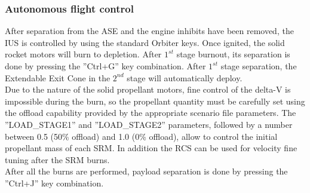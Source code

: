 \documentclass[Space_Shuttle_Ultra_Manual.tex]{subfiles}
\begin{document}
\begin{multicols*}{2}
\subsubsection{Autonomous flight control}
After separation from the ASE and the engine inhibits have been removed, the IUS is controlled by using the standard Orbiter keys. Once ignited, the solid rocket motors will burn to depletion. After $1^{st}$ stage burnout, its separation is done by pressing the ''Ctrl+G'' key combination. After $1^{st}$ stage separation, the Extendable Exit Cone in the $2^{nd}$ stage will automatically deploy.
\\
Due to the nature of the solid propellant motors, fine control of the delta-V is impossible during the burn, so the propellant quantity must be carefully set using the offload capability provided by the appropriate scenario file parameters. The ''LOAD\_STAGE1'' and ''LOAD\_STAGE2'' parameters, followed by a number between 0.5 (50\% offload) and 1.0 (0\% offload), allow to control the initial propellant mass of each SRM. In addition the RCS can be used for velocity fine tuning after the SRM burns.
\\
After all the burns are performed, payload separation is done by pressing the ''Ctrl+J'' key combination.
\end{multicols*}
\end{document}
